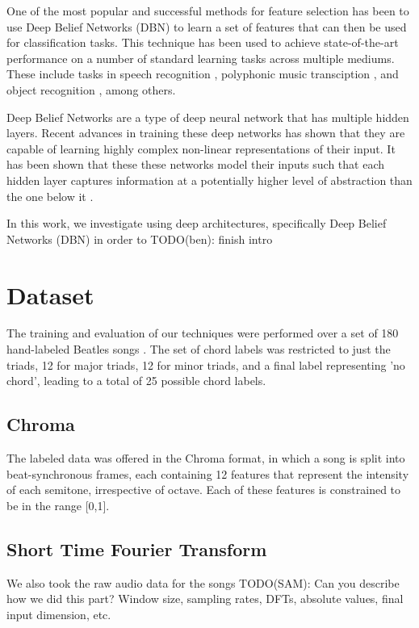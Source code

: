 \documentclass{article}
\begin{document}
One of the most popular and successful methods for feature selection has been
to use Deep Belief Networks (DBN) to learn a set of features that can then
be used for classification tasks. This technique has been used to achieve
state-of-the-art performance on a number of standard learning tasks across
multiple mediums. These include tasks in speech recognition 
\cite{Mohamed_acousticmodeling, dahl2010phone}, polyphonic music transciption
\cite{boulanger2012modeling}, and object recognition 
\cite{krizhevsky2012imagenet, ciresan2012multi, rifai2011manifold}, among
others.

Deep Belief Networks are a type of deep neural network that has multiple hidden
layers. Recent advances in training these deep networks has shown that they are
capable of learning highly complex non-linear representations of their input.
It has been shown that these these networks model their inputs such that each
hidden layer captures information at a potentially higher level of abstraction
than the one below it \cite{Bengio_learning}. 

In this work, we investigate using deep architectures, specifically
Deep Belief Networks (DBN) in order to
TODO(ben): finish intro

\section{Dataset} 
The training and evaluation of our techniques were performed over a set of 180
hand-labeled Beatles songs \cite{harte2010towards}. The set of chord labels
was restricted to just the triads, 12 for major triads, 12 for minor triads,
and a final label representing 'no chord', leading to a total of 25 possible
chord labels.

\subsection{Chroma}
The labeled data was offered in the Chroma format, in which a song is split into
beat-synchronous frames, each containing 12 features that represent the
intensity of each semitone, irrespective of octave. Each of these features
is constrained to be in the range [0,1].

\subsection{Short Time Fourier Transform}
We also took the raw audio data for the songs 
TODO(SAM): Can you describe how we did this part? Window size, sampling rates,
DFTs, absolute values, final input dimension, etc.
\end{document}
